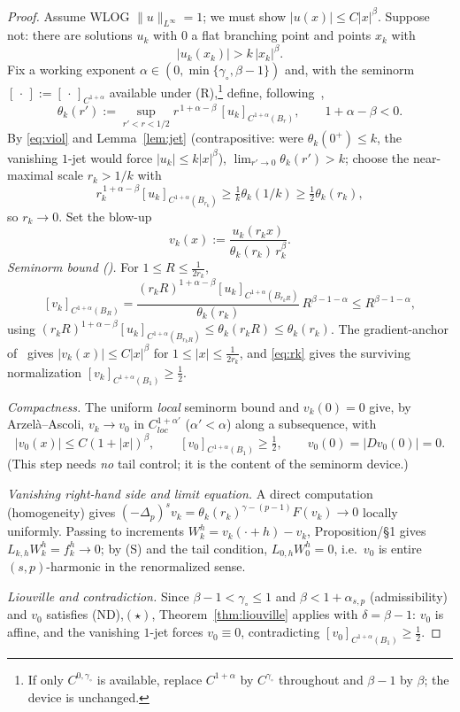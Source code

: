 \documentclass[11pt]{amsart}
\theoremstyle{plain}
\theoremstyle{definition}
\theoremstyle{remark}
\newcommand{\fpl}[1]{(-\Delta_p)^{s}#1}
\newcommand{\asp}{\alpha_{s,p}}
\begin{document}
\begin{proof}
Assume WLOG $\|u\|_{L^\infty}=1$; we must show $|u(x)|\le C|x|^\beta$. Suppose
not: there are solutions $u_k$ with $0$ a flat branching point and points $x_k$
with
\begin{equation}\label{eq:viol}
  |u_k(x_k)|>k\,|x_k|^{\beta}.
\end{equation}
Fix a working exponent $\alpha\in(0,\min\{\gamma_\circ,\beta-1\})$ and, with the
seminorm $[\,\cdot\,]:=[\,\cdot\,]_{C^{1+\alpha}}$ available under
\textnormal{(R)},\footnote{If only $C^{0,\gamma_\circ}$ is available, replace
$C^{1+\alpha}$ by $C^{\gamma_\circ}$ throughout and $\beta-1$ by $\beta$; the
device is unchanged.} define, following~\cite[(4.4)]{PTU},
\[
  \theta_k(r'):=\sup_{r'<r<1/2}r^{\,1+\alpha-\beta}\,[u_k]_{C^{1+\alpha}(B_r)},
  \qquad 1+\alpha-\beta<0 .
\]
By \eqref{eq:viol} and Lemma~\ref{lem:jet} (contrapositive: were
$\theta_k(0^+)\le k$, the vanishing $1$-jet would force $|u_k|\le k|x|^\beta$),
$\lim_{r'\to0}\theta_k(r')>k$; choose the near-maximal scale $r_k>1/k$ with
\begin{equation}\label{eq:rk}
  r_k^{\,1+\alpha-\beta}[u_k]_{C^{1+\alpha}(B_{r_k})}
  \ge\tfrac1k\theta_k(1/k)\ge\tfrac12\theta_k(r_k),
\end{equation}
so $r_k\to0$. Set the blow-up
\[
  v_k(x):=\frac{u_k(r_kx)}{\theta_k(r_k)\,r_k^{\beta}}.
\]
\emph{Seminorm bound (\cite[(4.8)]{PTU}).} For $1\le R\le\frac1{2r_k}$,
\[
  [v_k]_{C^{1+\alpha}(B_R)}
  =\frac{(r_kR)^{1+\alpha-\beta}[u_k]_{C^{1+\alpha}(B_{r_kR})}}{\theta_k(r_k)}
   \,R^{\beta-1-\alpha}\le R^{\beta-1-\alpha},
\]
using $(r_kR)^{1+\alpha-\beta}[u_k]_{C^{1+\alpha}(B_{r_kR})}\le\theta_k(r_kR)
\le\theta_k(r_k)$. The gradient-anchor of~\cite[\S4]{CP} gives $|v_k(x)|\le
C|x|^\beta$ for $1\le|x|\le\frac1{2r_k}$, and \eqref{eq:rk} gives the surviving
normalization $[v_k]_{C^{1+\alpha}(B_1)}\ge\frac12$.

\emph{Compactness.} The uniform \emph{local} seminorm bound and $v_k(0)=0$ give,
by Arzel\`a--Ascoli, $v_k\to v_0$ in $C^{1+\alpha'}_{loc}$ ($\alpha'<\alpha$)
along a subsequence, with
\[
  |v_0(x)|\le C(1+|x|)^{\beta},\qquad [v_0]_{C^{1+\alpha}(B_1)}\ge\tfrac12,
  \qquad v_0(0)=|Dv_0(0)|=0 .
\]
(This step needs \emph{no} tail control; it is the content of the seminorm
device.)

\emph{Vanishing right-hand side and limit equation.} A direct computation
(homogeneity) gives $\fpl{v_k}=\theta_k(r_k)^{\gamma-(p-1)}F(v_k)\to0$ locally
uniformly. Passing to increments $W_k^h=v_k(\cdot+h)-v_k$, Proposition/\S1 gives
$L_{k,h}W_k^h=f_k^h\to0$; by \textnormal{(S)} and the tail condition,
$L_{0,h}W_0^h=0$, i.e.\ $v_0$ is entire $(s,p)$-harmonic in the renormalized
sense.

\emph{Liouville and contradiction.} Since $\beta-1<\gamma_\circ\le1$ and
$\beta<1+\asp$ (admissibility) and $v_0$ satisfies \textnormal{(ND)},$(\star)$,
Theorem~\ref{thm:liouville} applies with $\delta=\beta-1$: $v_0$ is affine, and
the vanishing $1$-jet forces $v_0\equiv0$, contradicting
$[v_0]_{C^{1+\alpha}(B_1)}\ge\frac12$.
\end{proof}
\end{document}
